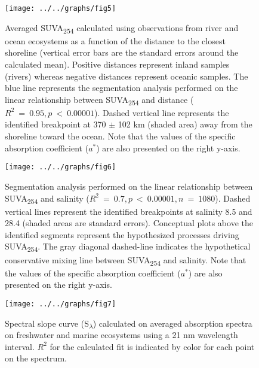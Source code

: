 \documentclass[12pt,a4paper]{scrartcl}
\begin{document}
\clearpage
\newpage

\begin{figure}[h]
	\centering
	\texttt{[image: ../../graphs/fig5]}
	\caption{Averaged SUVA\textsubscript{254} calculated using observations from river and ocean ecosystems as a function of the distance to the closest shoreline (vertical error bars are the standard errors around the calculated mean). Positive distances represent inland samples (rivers) whereas negative distances represent oceanic samples. The blue line represents the segmentation analysis performed on the linear relationship between SUVA\textsubscript{254} and distance ($R^2~=~0.95, p~<~0.00001$). Dashed vertical line represents the identified breakpoint at 370 $\pm$ 102 km (shaded area) away from the shoreline toward the ocean.  Note that the values of the specific absorption coefficient ($a^*$) are also presented on the right y-axis.}

\end{figure}

\clearpage
\newpage

\begin{figure}[h]
	\centering
	\texttt{[image: ../../graphs/fig6]}
	\caption{Segmentation analysis performed on the linear relationship between SUVA\textsubscript{254} and salinity ($R^2~=~0.7, p~<~0.00001, n~=~1080$). Dashed vertical lines represent the identified breakpoints at salinity 8.5 and 28.4 (shaded areas are standard errors). Conceptual plots above the identified segments represent the hypothesized processes driving SUVA\textsubscript{254}. The gray diagonal dashed-line indicates the hypothetical conservative mixing line between SUVA\textsubscript{254} and salinity.  Note that the values of the specific absorption coefficient ($a^*$) are also presented on the right y-axis.}
\end{figure}

\clearpage
\newpage

\begin{figure}[h]
	\centering
	\texttt{[image: ../../graphs/fig7]}
	\caption{Spectral slope curve (S\textsubscript{$\lambda$}) calculated on averaged absorption spectra on freshwater and marine ecosystems using a 21 nm wavelength interval. $R^2$ for the calculated fit is indicated by color for each point on the spectrum.}
\end{figure}
\end{document}
